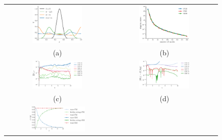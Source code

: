 \begin{figure}[t]
\begin{tabular}{cc}
\includegraphics[width=0.5\textwidth]{./figs/wave/solution} & 
\includegraphics[width=0.5\textwidth]{./figs/wave/singular} \\
(a) & (b) \\
\includegraphics[width=0.5\textwidth]{./figs/wave/error} & 
\includegraphics[width=0.5\textwidth]{./figs/wave/energy} \\
(c) & (d) \\
\includegraphics[width=0.55\textwidth]{./figs/wave/energy_conserved} &

\end{tabular}
\end{figure}

